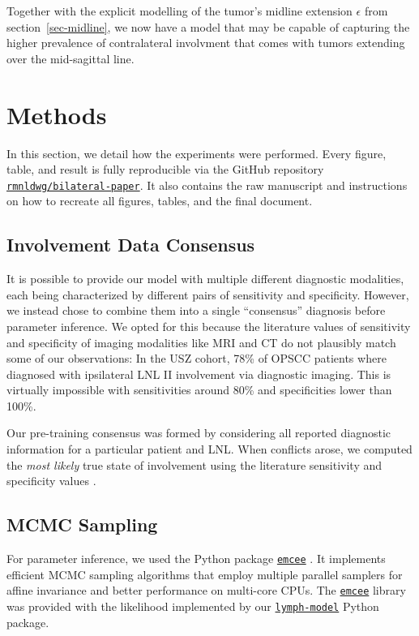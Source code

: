 \documentclass[
  sn-mathphys-num,
]{sn-jnl}
\begin{document}
Together with the explicit modelling of the tumor's midline extension
\(\epsilon\) from section~\ref{sec-midline}, we now have a model that
may be capable of capturing the higher prevalence of contralateral
involvment that comes with tumors extending over the mid-sagittal line.

\section{Methods}\label{methods}

In this section, we detail how the experiments were performed. Every
figure, table, and result is fully reproducible via the GitHub
repository
\href{https://github.com/rmnldwg/bilateral-paper}{\texttt{rmnldwg/bilateral-paper}}.
It also contains the raw manuscript and instructions on how to recreate
all figures, tables, and the final document.

\subsection{Involvement Data
Consensus}\label{involvement-data-consensus}

It is possible to provide our model with multiple different diagnostic
modalities, each being characterized by different pairs of sensitivity
and specificity. However, we instead chose to combine them into a single
``consensus'' diagnosis before parameter inference. We opted for this
because the literature values of sensitivity and specificity
\citep{debondt_detection_2007} of imaging modalities like MRI and CT do
not plausibly match some of our observations: In the USZ cohort, 78\% of
OPSCC patients where diagnosed with ipsilateral LNL II involvement via
diagnostic imaging. This is virtually impossible with sensitivities
around 80\% and specificities lower than 100\%.

Our pre-training consensus was formed by considering all reported
diagnostic information for a particular patient and LNL. When conflicts
arose, we computed the \emph{most likely} true state of involvement
using the literature sensitivity and specificity values
\citep{debondt_detection_2007}.

\subsection{MCMC Sampling}\label{sec-sampling}

For parameter inference, we used the Python package
\href{https://emcee.readthedocs.io/en/stable/}{\texttt{emcee}}
\citep{foreman-mackey_emcee_2013}. It implements efficient MCMC sampling
algorithms that employ multiple parallel samplers for affine invariance
and better performance on multi-core CPUs. The
\href{https://emcee.readthedocs.io/en/stable/}{\texttt{emcee}} library
was provided with the likelihood implemented by our
\href{https://lymph-model.readthedocs.io/en/stable/}{\texttt{lymph-model}}
Python package.
\end{document}
